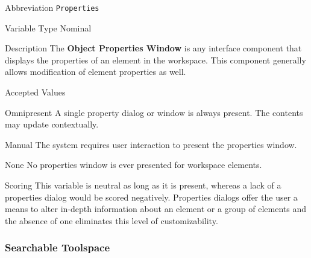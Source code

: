 \begin{AlignedDesc}
  \item[Abbreviation] \texttt{Properties}

  \item[Variable Type] Nominal

  \item[Description] The \textbf{Object Properties Window} is any interface
  component that displays the properties of an element in the workspace.
  This component generally allows modification of element properties as
  well.

  \item[Accepted Values]

  \begin{AlignedDesc}
    \item[Omnipresent] A single property dialog or window is always
    present. The contents may update contextually.
    \item[Manual] The system requires user interaction to present the
    properties window.
    \item[None] No properties window is ever presented for workspace
    elements.
  \end{AlignedDesc}

  \item[Scoring] This variable is neutral as long as it is present, whereas
  a lack of a properties dialog would be scored negatively. Properties
  dialogs offer the user a means to alter in-depth information about an
  element or a group of elements and the absence of one eliminates this
  level of customizability.

\end{AlignedDesc}

\subsubsection{Searchable Toolspace}
\label{subsubsec:searchable}

